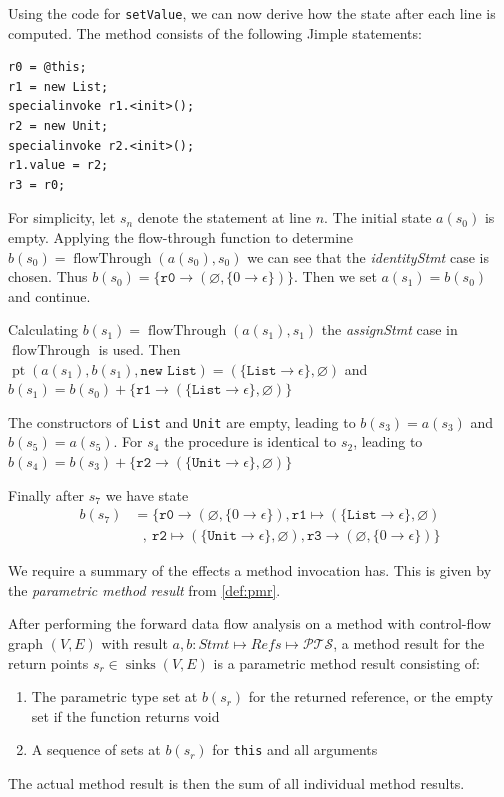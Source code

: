 \begin{example}
Using the code for \texttt{setValue}, we can now derive how the state after each line is computed. The  method consists of the following Jimple statements:
\begin{verbatim}
r0 = @this;
r1 = new List;
specialinvoke r1.<init>();
r2 = new Unit;
specialinvoke r2.<init>();
r1.value = r2;
r3 = r0;
\end{verbatim}

For simplicity, let $s_n$ denote the statement at line $n$. The initial state $a(s_0)$ is empty. Applying the flow-through function to determine $b(s_0) = \operatorname{flowThrough}(a(s_0), s_0)$ we can see that the \emph{identityStmt} case is chosen. Thus $b(s_0) = \{ \texttt{r0} \to (\varnothing, \{ 0 \to \epsilon \}) \}$. Then we set $a(s_1) = b(s_0)$ and continue. 

Calculating $b(s_1) = \operatorname{flowThrough}(a(s_1), s_1)$ the \emph{assignStmt} case in $\operatorname{flowThrough}$ is used. Then $\operatorname{pt}(a(s_1), b(s_1), \texttt{new List}) = (\{ \mathtt{List} \to \epsilon \}, \varnothing)$  and $b(s_1) = b(s_0) + \{ \mathtt{r1} \to (\{ \mathtt{List} \to \epsilon \}, \varnothing) \}$

The constructors of \texttt{List} and \texttt{Unit} are empty, leading to $b(s_3) = a(s_3)$ and $b(s_5) = a(s_5)$. For $s_4$ the procedure is identical to $s_2$, leading to $b(s_4) = b(s_3) + \{ \mathtt{r2} \to (\{ \mathtt{Unit} \to \epsilon \}, \varnothing) \}$

Finally after $s_7$ we have state 
\begin{align*}
    b(s_7) &= \{ \texttt{r0} \to (\varnothing, \{ 0 \to \epsilon \}), \texttt{r1} \mapsto (\{ \mathtt{List} \to \epsilon \}, \varnothing)\\
    &\ \ \ ,\ \texttt{r2} \mapsto (\{ \mathtt{Unit} \to \epsilon \}, \varnothing),  \texttt{r3} \to (\varnothing, \{ 0 \to \epsilon \}) \}
\end{align*}
\end{example}
We require a summary of the effects a method invocation has. This is given by the \emph{parametric method result} from \cref{def:pmr}.
\begin{definition}
After performing the forward data flow analysis on a method with control-flow graph $(V,E)$ with result $a, b : \mathit{Stmt} \mapsto \mathit{Refs} \mapsto \mathcal{PTS}$, a method result for the return points $s_r \in \operatorname{sinks}(V,E)$ is a parametric method result consisting of:
\begin{enumerate}
    \item The parametric type set at $b(s_r)$ for the returned reference, or the empty set if the function returns void
    \item A sequence of sets at $b(s_r)$ for \texttt{this} and all arguments
\end{enumerate}
The actual method result is then the sum of all individual method results.
\end{definition}
